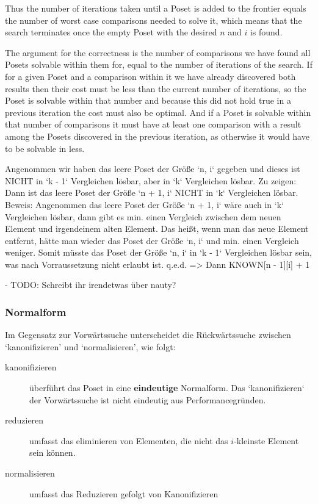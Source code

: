 \documentclass[10pt,journal,compsoc]{IEEEtran}
\begin{document}
Thus the number of iterations taken until a Poset is added to the frontier equals the number of
worst case comparisons needed to solve it, which means that the search terminates once the empty
Poset with the desired $n$ and $i$ is found.

The argument for the correctness is the number of comparisons we have found all Posets solvable
within them for, equal to the number of iterations of the search. If for a given Poset and a
comparison within it we have already discovered both results then their cost must be less than the
current number of iterations, so the Poset is solvable within that number and because this did not
hold true in a previous iteration the cost must also be optimal. And if a Poset is solvable within
that number of comparisons it must have at least one comparison with a result among the Posets
discovered in the previous iteration, as otherwise it would have to be solvable in less.


Angenommen wir haben das leere Poset der Größe `n, i` gegeben und dieses ist NICHT in `k - 1` Vergleichen lösbar, aber in `k` Vergleichen lösbar.
Zu zeigen: Dann ist das leere Poset der Größe `n + 1, i` NICHT in `k` Vergleichen lösbar.
Beweis: Angenommen das leere Poset der Größe `n + 1, i` wäre auch in `k` Vergleichen lösbar, dann gibt es min. einen Vergleich zwischen dem neuen Element und irgendeinem alten Element. Das heißt, wenn man das neue Element entfernt, hätte man wieder das Poset der Größe `n, i` und min. einen Vergleich weniger. Somit müsste das Poset der Größe `n, i` in `k - 1` Vergleichen lösbar sein, was nach Vorraussetzung nicht erlaubt ist. q.e.d.
=> Dann KNOWN[n - 1][i] + 1

- TODO: Schreibt ihr irendetwas über nauty?

\subsubsection{Normalform}
Im Gegensatz zur Vorwärtssuche unterscheidet die Rückwärtssuche zwischen `kanonifizieren' und `normalisieren', wie folgt:
\begin{description}
  \item[kanonifizieren]
    überführt das Poset in eine \textbf{eindeutige} Normalform.
    Das `kanonifizieren` der Vorwärtssuche ist nicht eindeutig aus Performancegründen.
  \item[reduzieren]
    umfasst das eliminieren von Elementen, die nicht das $i$-kleinste Element sein können.
  \item[normalisieren]
    umfasst das Reduzieren gefolgt von Kanonifizieren
\end{description}
\end{document}

